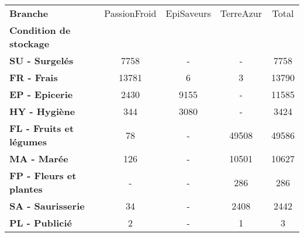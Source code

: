 \begin{tabular}{lcccc}
\toprule
\textbf{Branche} & PassionFroid & EpiSaveurs & TerreAzur &  Total \\
\textbf{Condition de stockage } &              &            &           &        \\
\midrule
\textbf{SU - Surgelés         } &         7758 &          - &         - &   7758 \\
\textbf{FR - Frais            } &        13781 &          6 &         3 &  13790 \\
\textbf{EP - Epicerie         } &         2430 &       9155 &         - &  11585 \\
\textbf{HY - Hygiène          } &          344 &       3080 &         - &   3424 \\
\textbf{FL - Fruits et légumes} &           78 &          - &     49508 &  49586 \\
\textbf{MA - Marée            } &          126 &          - &     10501 &  10627 \\
\textbf{FP - Fleurs et plantes} &            - &          - &       286 &    286 \\
\textbf{SA - Saurisserie      } &           34 &          - &      2408 &   2442 \\
\textbf{PL - Publicié         } &            2 &          - &         1 &      3 \\
\bottomrule
\end{tabular}
